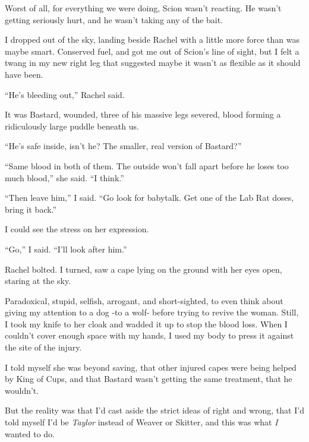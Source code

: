 Worst of all, for everything we were doing, Scion wasn't reacting.  He wasn't getting seriously hurt, and he wasn't taking any of the bait.



I dropped out of the sky, landing beside Rachel with a little more force than was maybe smart.  Conserved fuel, and got me out of Scion's line of sight, but I felt a twang in my new right leg that suggested maybe it wasn't as flexible as it should have been.



``He's bleeding out,'' Rachel said.



It was Bastard, wounded, three of his massive legs severed, blood forming a ridiculously large puddle beneath us.



``He's safe inside, isn't he?  The smaller, real version of Bastard?''



``Same blood in both of them.  The outside won't fall apart before he loses too much blood,'' she said.  ``I think.''



``Then leave him,'' I said.  ``Go look for babytalk.  Get one of the Lab Rat doses, bring it back.''



I could see the stress on her expression.



``Go,'' I said.  ``I'll look after him.''



Rachel bolted.  I turned, saw a cape lying on the ground with her eyes open, staring at the sky.



Paradoxical, stupid, selfish, arrogant, and short-sighted, to even think about giving my attention to a dog -to a wolf- before trying to revive the woman.  Still, I took my knife to her cloak and wadded it up to stop the blood loss.  When I couldn't cover enough space with my hands, I used my body to press it against the site of the injury.



I told myself she was beyond saving, that other injured capes were being helped by King of Cups, and that Bastard wasn't getting the same treatment, that he wouldn't.



But the reality was that I'd cast aside the strict ideas of right and wrong, that I'd told myself I'd be \emph{Taylor} instead of Weaver or Skitter, and this was what \emph{I} wanted to do.



